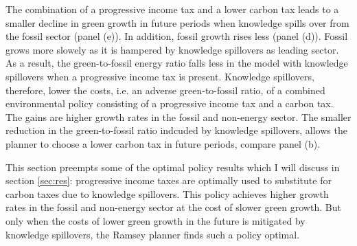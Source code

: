  

The combination of a progressive income tax and a lower carbon tax leads to a smaller decline in green growth in future periods when knowledge spills over from the fossil sector (panel (e)). In addition, fossil growth rises less (panel (d)). Fossil grows more slowely as it is hampered by knowledge spillovers as leading sector. As a result, the green-to-fossil energy ratio falls less in the model with knowledge spillovers when a progressive income tax is present. Knowledge spillovers, therefore, lower the costs, i.e. an adverse green-to-fossil ratio, of a combined environmental policy consisting of a progressive income tax and a carbon tax. The gains are higher growth rates in the fossil and non-energy sector.
The smaller reduction in the green-to-fossil ratio indcuded by knowledge spillovers, allows the planner to choose a lower carbon tax in future periods, compare panel (b).

This section preempts some of the optimal policy results which I will discuss in section \ref{sec:res}: progressive income taxes are optimally used to substitute for carbon taxes due to knowledge spillovers. This policy achieves higher growth rates in the fossil and non-energy sector at the cost of slower green growth.
 But only when the costs of lower green growth in the future is mitigated by knowledge spillovers, the Ramsey planner finds such a policy optimal. 

